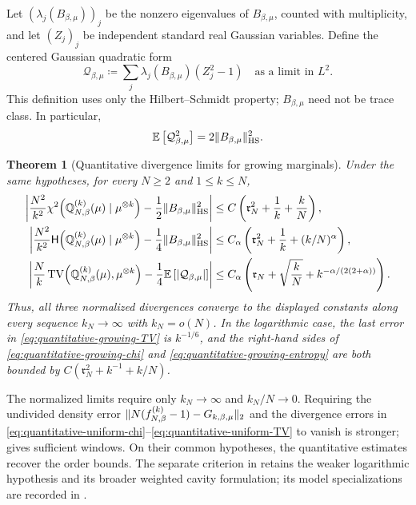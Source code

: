 \documentclass[11pt,reqno]{amsart}
\numberwithin{equation}{section}
\theoremstyle{plain}
\newtheorem{thm}{Theorem}[section]
\theoremstyle{remark}
\DeclarePairedDelimiter{\abs}{\lvert}{\rvert}
\DeclarePairedDelimiter{\norm}{\lVert}{\rVert}
\newcommand{\E}{{\mathbb{E}}}
\newcommand{\Q}{{\mathbb{Q}}}
\newcommand{\Hr}{{\mathsf{H}}}
\newcommand{\be}{\beta}
\newcommand{\Chi}{\chi^2}
\newcommand{\TV}{\operatorname{TV}}
\begin{document}
Let $(\lambda_j(B_{\be,\mu}))_j$ be the nonzero eigenvalues of $B_{\be,\mu}$, counted with multiplicity, and let $(Z_j)_j$ be independent standard real Gaussian variables.  Define the centered Gaussian quadratic form
\begin{equation}\label{eq:quantitative-centered-Gaussian-quadratic-form}
 \mathcal Q_{\be,\mu}\coloneqq\sum_j\lambda_j(B_{\be,\mu})(Z_j^2-1)
 \quad\text{as a limit in }L^2.
\end{equation}
This definition uses only the Hilbert--Schmidt property; $B_{\be,\mu}$ need not be trace class.  In particular,
\begin{equation}\label{eq:quantitative-Gaussian-variance}
 \E\left[\mathcal Q_{\be,\mu}^2\right]=2\norm{B_{\be,\mu}}_{\mathrm{HS}}^2.
\end{equation}

\begin{thm}[Quantitative divergence limits for growing marginals]
\label{thm:quantitative-growing-marginal-constants}
Under the same hypotheses, for every $N\geq2$ and $1\leq k\leq N$,
\begin{align}
 \left|\frac{N^2}{k^2}\Chi\!\left(\Q_{N,\be}^{(k)}(\mu)\mid\mu^{\otimes k}\right)-\frac12\norm{B_{\be,\mu}}_{\mathrm{HS}}^2\right|
 &\leq C\left(\mathfrak r_N^2+\frac1k+\frac{k}{N}\right),
 \label{eq:quantitative-growing-chi}\\
 \left|\frac{N^2}{k^2}\Hr\!\left(\Q_{N,\be}^{(k)}(\mu)\mid\mu^{\otimes k}\right)-\frac14\norm{B_{\be,\mu}}_{\mathrm{HS}}^2\right|
 &\leq C_\alpha\left(\mathfrak r_N^2+\frac1k+(k/N)^\alpha\right),
 \label{eq:quantitative-growing-entropy}\\
 \left|\frac Nk\TV\!\left(\Q_{N,\be}^{(k)}(\mu),\mu^{\otimes k}\right)-\frac14\E\left[\abs{\mathcal Q_{\be,\mu}}\right]\right|
 &\leq C_\alpha\left(\mathfrak r_N+\sqrt{\frac{k}{N}}+k^{-\alpha/(2(2+\alpha))}\right).
 \label{eq:quantitative-growing-TV}
\end{align}
Thus, all three normalized divergences converge to the displayed constants along every sequence $k_N\to\infty$ with $k_N=o(N)$.  In the logarithmic case, the last error in \eqref{eq:quantitative-growing-TV} is $k^{-1/6}$, and the right-hand sides of \eqref{eq:quantitative-growing-chi} and \eqref{eq:quantitative-growing-entropy} are both bounded by $C(\mathfrak r_N^2+k^{-1}+k/N)$.
\end{thm}

The normalized limits require only $k_N\to\infty$ and $k_N/N\to0$.
Requiring the undivided density error
$\norm{N(f_{N,\be}^{(k)}-1)-G_{k,\be,\mu}}_2$ and the divergence errors
in \eqref{eq:quantitative-uniform-chi}--\eqref{eq:quantitative-uniform-TV}
to vanish is stronger; 
gives sufficient windows.  On their common hypotheses, the quantitative
estimates recover the order bounds.  The separate criterion in  retains the weaker logarithmic hypothesis and its broader weighted cavity formulation; its model specializations are recorded in .
\end{document}
